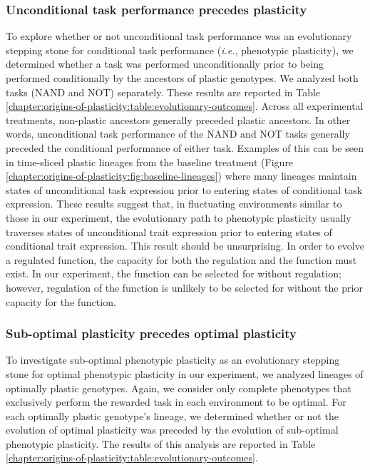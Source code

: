 \subsubsection{Unconditional task performance precedes plasticity}

To explore whether or not unconditional task performance was an evolutionary stepping stone for conditional task performance (\textit{i.e.}, phenotypic plasticity), we determined whether a task was performed unconditionally prior to being performed conditionally by the ancestors of plastic genotypes. 
We analyzed both tasks (NAND and NOT) separately. These results are reported in Table \ref{chapter:origins-of-plasticity:table:evolutionary-outcomes}. 
Across all experimental treatments, non-plastic ancestors generally preceded plastic ancestors. 
In other words, unconditional task performance of the NAND and NOT tasks generally preceded the conditional performance of either task. 
Examples of this can be seen in time-sliced plastic lineages from the baseline treatment (Figure \ref{chapter:origins-of-plasticity:fig:baseline-lineages}) where many lineages maintain states of unconditional task expression prior to entering states of conditional task expression. 
These results suggest that, in fluctuating environments similar to those in our experiment, the evolutionary path to phenotypic plasticity usually traverses states of unconditional trait expression prior to entering states of conditional trait expression. 
This result should be unsurprising. 
In order to evolve a regulated function, the capacity for both the regulation and the function must exist. 
In our experiment, the function can be selected for without regulation; however, regulation of the function is unlikely to be selected for without the prior capacity for the function. 

\subsubsection{Sub-optimal plasticity precedes optimal plasticity}

To investigate sub-optimal phenotypic plasticity as an evolutionary stepping stone for optimal phenotypic plasticity in our experiment, we analyzed lineages of optimally plastic genotypes. 
Again, we consider only complete phenotypes that exclusively perform the rewarded task in each environment to be optimal. 
For each optimally plastic genotype's lineage, we determined whether or not the evolution of optimal plasticity was preceded by the evolution of sub-optimal phenotypic plasticity. 
The results of this analysis are reported in Table \ref{chapter:origins-of-plasticity:table:evolutionary-outcomes}.

